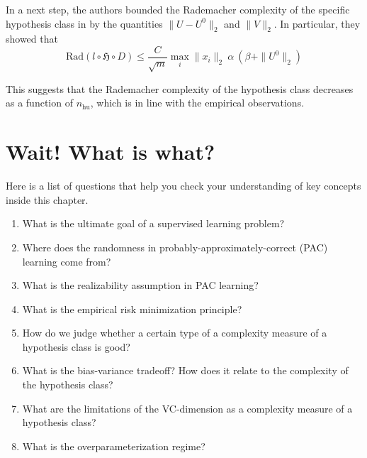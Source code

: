 In a next step, the authors bounded the Rademacher complexity of the specific
hypothesis class in  by the quantities $\|U-U^0\|_2$ and
$\|V\|_2$. In particular, they showed that
$$
\text{Rad}(l \circ \mathfrak{H} \circ D) \leq \frac{C}{\sqrt{m}} \max_i \|x_i\|_2 \ \alpha \ (\beta+ \|U^0\|_2)
$$

This suggests that the Rademacher complexity of the
hypothesis class decreases as a function of $n_{\text{hu}}$, which is in
line with the empirical observations.

\section*{Wait! What is what?}
Here is a list of questions that help you check your understanding of key
concepts inside this chapter.

\begin{enumerate}
    \item What is the ultimate goal of a supervised learning problem? 
    \item  Where does the randomness in probably-approximately-correct (PAC) learning come from?
    \item What is the realizability assumption in PAC learning?
    \item What is the empirical risk minimization principle?
    \item How do we judge whether a certain type of a complexity measure of a hypothesis class is good?
    \item What is the bias-variance tradeoff? How does it relate to the complexity of the hypothesis class?
    \item What are the limitations of the VC-dimension as a complexity measure of a hypothesis class?
    \item What is the overparameterization regime?
\end{enumerate}

